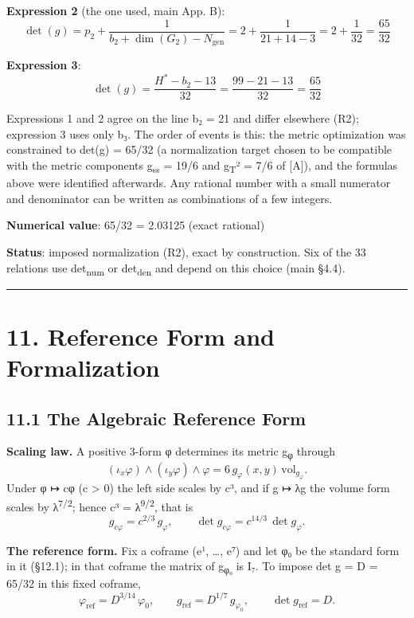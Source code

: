 \documentclass[11pt,a4paper]{article}
\begin{document}
\textbf{Expression 2} (the one used, main App. B): \[\det(g) = p_2 + \frac{1}{b_2 + \dim(G_2) - N_{\text{gen}}} = 2 + \frac{1}{21+14-3} = 2 + \frac{1}{32} = \frac{65}{32}\]

\textbf{Expression 3}: \[\det(g) = \frac{H^* - b_2 - 13}{32} = \frac{99 - 21 - 13}{32} = \frac{65}{32}\]

Expressions 1 and 2 agree on the line b₂ = 21 and differ elsewhere (R2); expression 3 uses only b₃. The order of events is this: the metric optimization was constrained to det(g) = 65/32 (a normalization target chosen to be compatible with the metric components g\textsubscript{ss} = 19/6 and g\textsubscript{T}² = 7/6 of {[}A{]}), and the formulas above were identified afterwards. Any rational number with a small numerator and denominator can be written as combinations of a few integers.

\textbf{Numerical value}: 65/32 = 2.03125 (exact rational)

\textbf{Status}: imposed normalization (R2), exact by construction. Six of the 33 relations use det\textsubscript{num} or det\textsubscript{den} and depend on this choice (main §4.4).

\begin{center}\rule{\linewidth}{0.5pt}\end{center}

\section{11. Reference Form and Formalization}\label{reference-form-and-formalization}

\subsection{11.1 The Algebraic Reference Form}\label{the-algebraic-reference-form}

\textbf{Scaling law.} A positive 3-form φ determines its metric g\textsubscript{φ} through \[(\iota_x\varphi)\wedge(\iota_y\varphi)\wedge\varphi = 6\, g_\varphi(x,y)\,\mathrm{vol}_{g_\varphi}.\] Under φ ↦ cφ (c \textgreater{} 0) the left side scales by c³, and if g ↦ λg the volume form scales by λ\textsuperscript{7/2}; hence c³ = λ\textsuperscript{9/2}, that is \[g_{c\varphi} = c^{2/3}\, g_\varphi, \qquad \det g_{c\varphi} = c^{14/3}\,\det g_\varphi .\]

\textbf{The reference form.} Fix a coframe (e¹, \ldots, e⁷) and let φ₀ be the standard form in it (§12.1); in that coframe the matrix of g\textsubscript{φ₀} is I₇. To impose det g = D = 65/32 in this fixed coframe, \[\boxed{\varphi_{\text{ref}} = D^{3/14}\,\varphi_0, \qquad g_{\text{ref}} = D^{1/7}\, g_{\varphi_0}, \qquad \det g_{\text{ref}} = D.}\]
\end{document}
